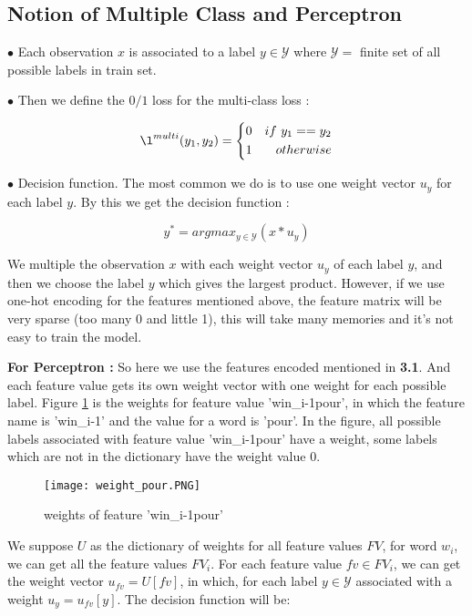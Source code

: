 \documentclass{article}
\def\YY{{\mathcal{Y}}}
\begin{document}
\subsection{Notion of Multiple Class and Perceptron}
$\bullet$ Each observation $x$ is associated to a label $y \in \YY$ where $\YY = $ finite set of all possible labels in train set. 

$\bullet$ Then we define the $0/1$ loss for the multi-class loss : 

\begin{equation}
\l^{multi}(y_1, y_2) = \left\{
\begin{aligned}
0 & & if\ y_1 == y_2\\
1 & &otherwise
\end{aligned}
\right.
\end{equation}

$\bullet$ Decision function. The most common we do is to use one weight vector $u_y$ for each label $y$. By this we get the decision function :

\begin{equation}
y^* = argmax_{y \in \YY} (x*u_y)
\end{equation}

We multiple the observation $x$ with each weight vector $u_y$ of each label $y$, and then we choose the label $y$ which gives the largest product. However, if we use one-hot encoding for the features mentioned above, the feature matrix will be very sparse (too many 0 and little 1), this will take many memories and it's not easy to train the model.

\textbf{For Perceptron : } So here we use the features encoded mentioned in \textbf{3.1}. And each feature value gets its own weight vector with one weight for each possible label. Figure \ref{figure2} is the weights for feature value 'win\_i-1pour', in which the feature name is 'win\_i-1' and the value for a word is 'pour'. In the figure, all possible labels associated with feature value 'win\_i-1pour' have a weight, some labels which are not in the dictionary have the weight value 0.

\begin{figure}[ht]
\centering
\texttt{[image: weight\_pour.PNG]}
\caption{weights of feature 'win\_i-1pour'}
\label{figure2}
\end{figure}

We suppose $U$ as the dictionary of weights for all feature values $FV$,  for word $w_i$, we can get all the feature values $FV_i$. For each feature value $fv \in FV_i$, we can get the weight vector $u_{fv} = U[fv]$, in which, for each label $y \in \YY$ associated with a weight $u_y = u_{fv} [y]$. The decision function will be:
\end{document}
